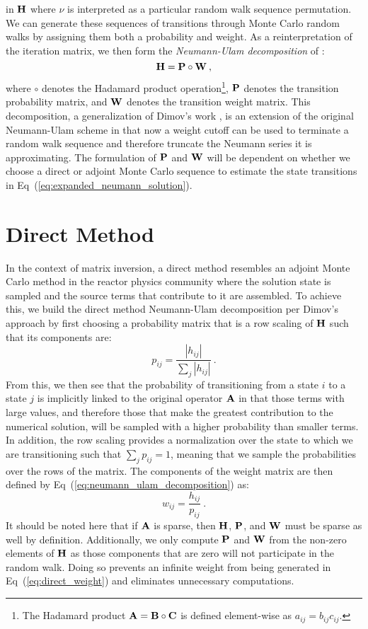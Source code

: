 in $\mathbf{H}$ where $\nu$ is interpreted as a particular random walk
sequence permutation. We can generate these sequences of transitions
through Monte Carlo random walks by assigning them both a probability
and weight. As a reinterpretation of the iteration matrix, we then
form the \textit{Neumann-Ulam decomposition} of :
\begin{equation}
  \mathbf{H} = \mathbf{P} \circ \mathbf{W}\:,
  \label{eq:neumann_ulam_decomposition}
\end{equation}
where $\circ$ denotes the Hadamard product operation\footnote{The
  Hadamard product $\mathbf{A} = \mathbf{B} \circ \mathbf{C}$ is defined
  element-wise as $a_{ij} = b_{ij} c_{ij}$.}, $\mathbf{P}$ denotes the
transition probability matrix, and $\mathbf{W}$ denotes the transition
weight matrix. This decomposition, a generalization of Dimov's work
\citep{dimov_new_1998}, is an extension of the original Neumann-Ulam
scheme in that now a weight cutoff can be used to terminate a random
walk sequence and therefore truncate the Neumann series it is
approximating. The formulation of $\mathbf{P}$ and $\mathbf{W}$ will be
dependent on whether we choose a direct or adjoint Monte Carlo
sequence to estimate the state transitions in
Eq~(\ref{eq:expanded_neumann_solution}).

\section{Direct Method}
\label{sec:direct_mc}
In the context of matrix inversion, a direct method resembles an
adjoint Monte Carlo method in the reactor physics community where the
solution state is sampled and the source terms that contribute to it
are assembled. To achieve this, we build the direct method
Neumann-Ulam decomposition per Dimov's approach by first choosing a
probability matrix that is a row scaling of $\mathbf{H}$ such that its
components are:
\begin{equation}
  p_{ij} = \frac{|h_{ij}|}{\sum_j |h_{ij}|}\:.
  \label{eq:direct_probability}
\end{equation}
From this, we then see that the probability of transitioning from a
state $i$ to a state $j$ is implicitly linked to the original operator
$\mathbf{A}$ in that those terms with large values, and therefore those
that make the greatest contribution to the numerical solution, will be
sampled with a higher probability than smaller terms. In addition, the
row scaling provides a normalization over the state to which we are
transitioning such that $\sum_j p_{ij} = 1$, meaning that we sample
the probabilities over the rows of the matrix. The components of
the weight matrix are then defined by
Eq~(\ref{eq:neumann_ulam_decomposition}) as:
\begin{equation}
  w_{ij} = \frac{h_{ij}}{p_{ij}}\:.
  \label{eq:direct_weight}
\end{equation}
It should be noted here that if $\mathbf{A}$ is sparse, then $\mathbf{H}$,
$\mathbf{P}$, and $\mathbf{W}$ must be sparse as well by
definition. Additionally, we only compute $\mathbf{P}$ and $\mathbf{W}$ from
the non-zero elements of $\mathbf{H}$ as those components that are zero
will not participate in the random walk. Doing so prevents an
infinite weight from being generated in Eq~(\ref{eq:direct_weight})
and eliminates unnecessary computations.

